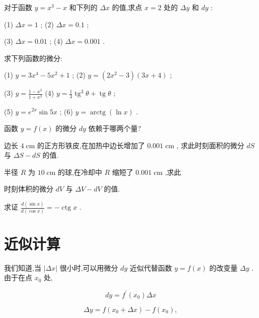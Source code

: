 \documentclass[lang=cn,newtx,10pt,scheme=chinese]{elegantbook}
\begin{document}
\begin{problemset}[练习]

\item 对于函数 \(y = {x}^{3} - x\) 和下列的 \({\Delta x}\) 的值,求点 \(x = 2\) 处的 \({\Delta y}\) 和 \({dy}\) :

(1) \({\Delta x} = 1\) ; (2) \({\Delta x} = {0.1}\) ;

(3) \({\Delta x} = {0.01}\) ; (4) \({\Delta x} = {0.001}\) .

\item 求下列函数的微分:

(1) \(y = 3{x}^{4} - 5{x}^{2} + 1\) ; (2) \(y = \left( {2{x}^{2} - 3}\right) \left( {{3x} + 4}\right)\) ;

(3) \(y = \frac{1 - {x}^{2}}{1 + {x}^{2}}\) (4) \(y = \frac{1}{3}{\operatorname{tg}}^{3}\theta + \operatorname{tg}\theta\) ;

(5) \(y = {e}^{2x}\sin {5x}\) ; (6) \(y = \operatorname{arctg}\left( {\ln x}\right)\) .

\item 函数 \(y = f\left( x\right)\) 的微分 \({dy}\) 依赖于哪两个量?

\item 边长 \(4\mathrm{\;{cm}}\) 的正方形铁皮,在加热中边长增加了 \({0.001}\mathrm{\;{cm}}\) , 求此时刻面积的微分 \({dS}\) 与 \({\Delta S} - {dS}\) 的值.

\item 半径 \(R\) 为 \({10}\mathrm{\;{cm}}\) 的球,在冷却中 \(R\) 缩短了 \({0.001}\mathrm{\;{cm}}\) ,求此

时刻体积的微分 \({dV}\) 与 \({\Delta V} - {dV}\) 的值.

\item 求证 \(\frac{d\left( {\sin x}\right) }{d\left( {\cos x}\right) } = - \operatorname{ctg}x\) .

\end{problemset}

\section{近似计算}

我们知道,当 \(\left| {\Delta x}\right|\) 很小时,可以用微分 \({dy}\) 近似代替函数 \(y = f\left( x\right)\) 的改变量 \({\Delta y}\) . 由于在点 \({x}_{0}\) 处,

\[
{dy} = {f}^{\prime }\left( {x}_{0}\right) {\Delta x}
\]

\[
{\Delta y} = f\left( {{x}_{0} + {\Delta x}}\right) - f\left( {x}_{0}\right) ,
\]
\end{document}
